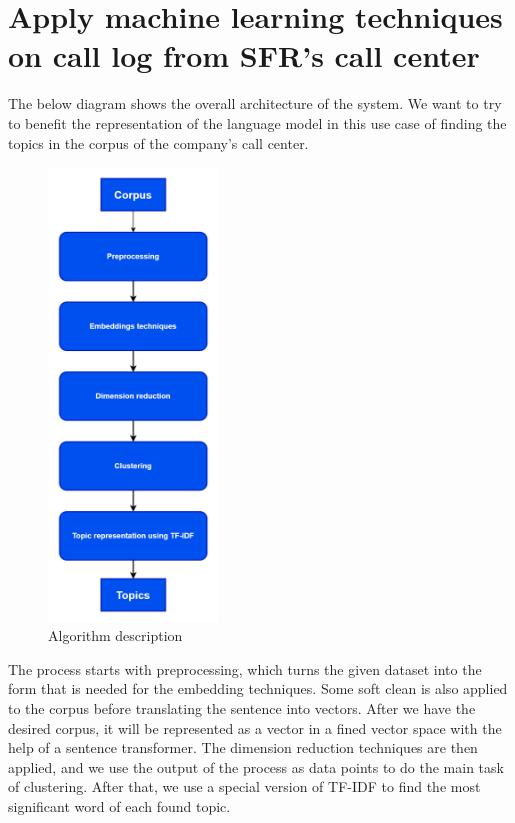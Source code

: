 \section{Apply machine learning techniques on call log from SFR's call center}

The below diagram shows the overall architecture of the system. We want to try to benefit the representation of the language model in this use case of finding the topics in the corpus of the company's call center.

\begin{figure}[H]
    \centering
    \includegraphics[width=0.4\textwidth]{images/describe_nlp.drawio.png}
    \caption{Algorithm description}
    \label{fig:nlp_describe}
\end{figure}

The process starts with preprocessing, which turns the given dataset into the form that is needed for the embedding techniques. Some soft clean is also applied to the corpus before translating the sentence into vectors. After we have the desired corpus, it will be represented as a vector in a fined vector space with the help of a sentence transformer. The dimension reduction techniques are then applied, and we use the output of the process as data points to do the main task of clustering. After that, we use a special version of TF-IDF to find the most significant word of each found topic.

